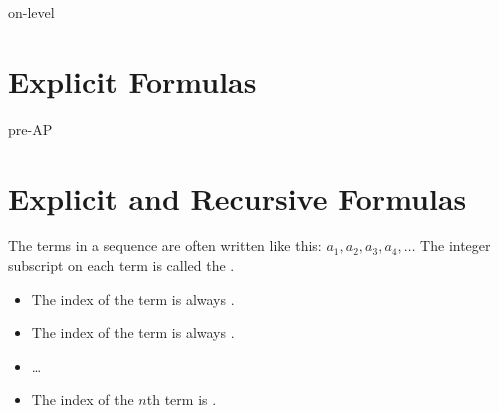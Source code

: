 \begin{taggedblock}{on-level}
    \section{Explicit Formulas}
\end{taggedblock}
\begin{taggedblock}{pre-AP}
    \section{Explicit and Recursive Formulas}
\end{taggedblock}
            
The terms in a sequence are often written like this:
$ a_1, a_2, a_3, a_4, \dots$
The integer subscript on each term is called the .
\begin{itemize}[nosep]
    \item The index of the  term is always .
    \item The index of the  term is always .
    \item \dots
    \item The index of the $n$th term is .
\end{itemize}


